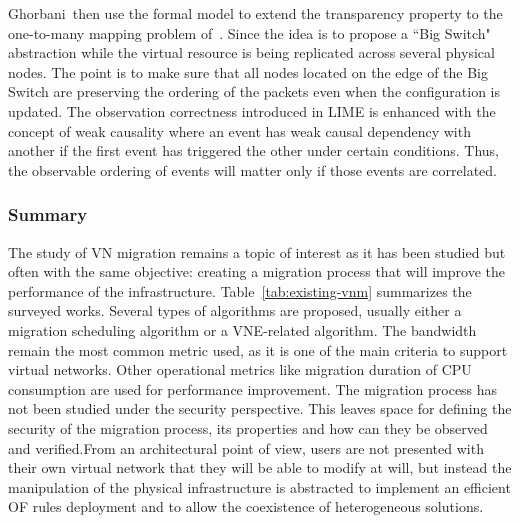 Ghorbani~\etal then use the formal model to extend the transparency property to the one-to-many mapping problem of~\cite{toward-Ghorbani2014}.
Since the idea is to propose a ``Big Switch" abstraction while  the virtual resource is being replicated across several physical nodes. The point is to make sure that all nodes located on the edge of the Big Switch are preserving the ordering of the packets even when the configuration is updated.
The observation correctness introduced in LIME is enhanced with the concept of weak causality where an event has weak causal dependency with another if the first event has triggered the other under certain conditions.
Thus, the observable ordering of events will matter only if those events are correlated.


\subsubsection{Summary}
The study of VN migration remains a topic of interest as it has been studied but often with the same objective: creating a migration process that will improve the performance of the infrastructure. 
Table~\ref{tab:existing-vnm} summarizes the surveyed works. Several types of algorithms are proposed, usually either a migration scheduling algorithm or a VNE-related algorithm. 
The bandwidth remain the most common metric used, as it is one of the main criteria to support virtual networks. Other operational metrics like migration duration of CPU consumption are used for performance improvement.
The migration process has not been studied under the security perspective.
This leaves space for defining the security of the migration process, its properties and how can they be observed and verified.From an architectural point of view, users are not presented with their own virtual network that they will be able to modify at will, but instead the manipulation of the physical infrastructure is abstracted to implement an efficient OF rules deployment and to allow the coexistence of heterogeneous solutions.

